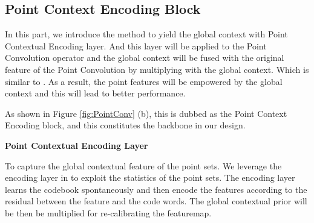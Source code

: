 \documentclass[runningheads]{llncs}
\begin{document}






\subsection{Point Context Encoding Block}

In this part, we introduce the  method  to yield  the global context with Point Contextual Encoding layer. %
And this layer will be applied to  
the Point Convolution operator and the global context will be fused  with the original feature of the Point Convolution by multiplying with the global context. Which is similar to \cite{SENet}.  As a result, the point features will be empowered by the global context and this will lead to better performance. 

As shown in Figure \ref{fig:PointConv} (b), this is dubbed as the Point Context Encoding block, and this constitutes the backbone in our design. 

\label{section:method}

\noindent \textbf{Point Contextual Encoding Layer}

To capture the global contextual feature of the point sets. We leverage the encoding layer in \cite{DeepTEN} to exploit the statistics of the point sets. The encoding layer learns the codebook spontaneously and then encode the features according to  the  residual between the feature and the code words. The global contextual prior will be then be multiplied for re-calibrating the featuremap.
\end{document}
